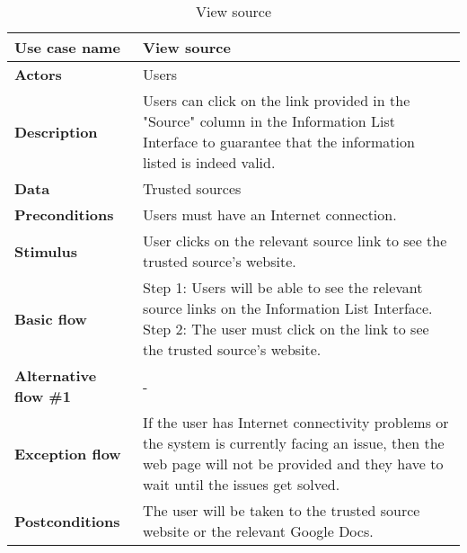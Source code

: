 \documentclass[listof=nochaptergap]{report}
\begin{document}
        \begin{table}[H]
        \centering
         \begin{tabular}{| p{4cm} | p{10cm} |} 
         \hline
         \textbf{Use case name} & View source \\
         \hline
         \textbf{Actors} & Users \\
         \hline
         \textbf{Description} & Users can click on the link provided in the "Source" column in the Information List Interface to guarantee that the information listed is indeed valid. \\
         \hline
         \textbf{Data} & Trusted sources \\
         \hline
         \textbf{Preconditions} & Users must have an Internet connection. \\
         \hline
         \textbf{Stimulus} & User clicks on the relevant source link to see the trusted source's website. \\
         \hline
         \textbf{Basic flow} & Step 1: Users will be able to see the relevant source links on the Information List Interface.
         \newline Step 2: The user must click on the link to see the trusted source's website. \\
         \hline
         \textbf{Alternative flow \#1} & - \\
         \hline
         \textbf{Exception flow} & If the user has Internet connectivity problems or the system is currently facing an issue, then the web page will not be provided and they have to wait until the issues get solved. \\
         \hline
         \textbf{Postconditions} & The user will be taken to the trusted source website or the relevant Google Docs. \\
         \hline
         \end{tabular}
        \caption{View source}
        \label{tab:table14}
    \end{table}
\end{document}
